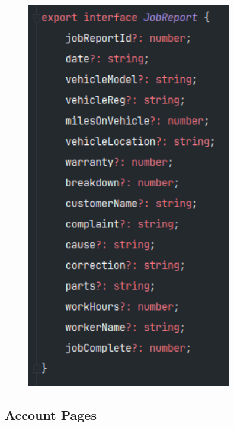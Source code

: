 \begin{figure}[H]
\begin{minipage}[b]{0.45\linewidth}
    \includegraphics[width=0.8\textwidth]{images/repota/models/report_model.png}
\end{minipage}
\end{figure}

\subsection{Account Pages}

